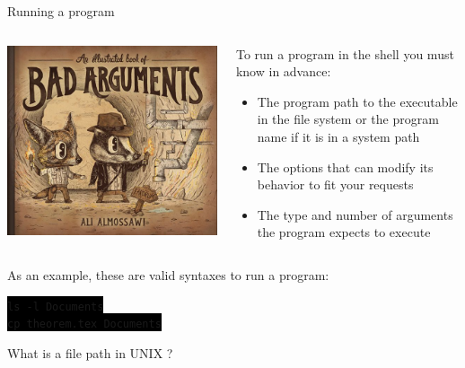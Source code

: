\documentclass[unknownkeysallowed, 10pt, a4 paper, handout]{beamer}
\newcommand{\code}[1]{\colorbox{black}{\color{green}\texttt{#1}}}
\begin{document}
\begin{frame}[label=running]{Running a program}
  \begin{columns}[T]
    \begin{column}{.33\textwidth}
      \includegraphics[scale=0.99]{pics/bad_arguments.jpg}
    \end{column}
    \hfill
    \begin{column}{.63\textwidth}
      \small{
      To run a program in the shell you must know in advance:
      \begin{itemize}
        \item The program path to the executable in the file system or the
          program name if it is in a system path
        \item The options that can modify its behavior to fit your requests
        \item The type and number of arguments the program expects to
          execute
      \end{itemize}
    }
    \end{column}
  \end{columns}
  As an example, these are valid syntaxes to run a program:
  \begin{center}
  \code{ls -l Documents} \\
  \code{cp theorem.tex Documents}
  \end{center}
  \begin{center}
    \Large{What is a file path in UNIX ?}
  \end{center}
\end{frame}
\end{document}
